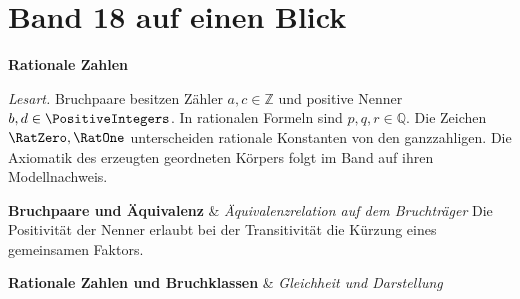 \chapter[Band 18: Rationale Zahlen]{Band 18 auf einen Blick}
\noindent\textbf{Rationale Zahlen}\par\medskip
\noindent\emph{Lesart.}
Bruchpaare besitzen Zähler \(a,c\in\mathbb Z\) und positive Nenner
\(b,d\in\PositiveIntegers\). In rationalen Formeln sind \(p,q,r\in\mathbb Q\).
Die Zeichen \(\RatZero,\RatOne\) unterscheiden rationale Konstanten von
den ganzzahligen. Die Axiomatik des erzeugten geordneten Körpers folgt
im Band auf ihren Modellnachweis.

\begin{BandUebersicht}
\textbf{Bruchpaare und Äquivalenz}
&
\textit{Äquivalenzrelation auf dem Bruchträger}
Die Positivität der Nenner erlaubt bei der Transitivität
die Kürzung eines gemeinsamen Faktors.
\\ \addlinespace[.8ex]

\textbf{Rationale Zahlen und Bruchklassen}
&
\textit{Gleichheit und Darstellung}
\\ \addlinespace[.8ex]


\end{BandUebersicht}
